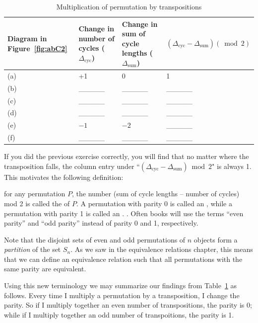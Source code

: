 \begin{table}[!htb]
\caption{Multiplication of permutation by transpositions}\label{transposition_table}
\begin{tabular}{|p{1.9cm}|p{2.9cm}|p{2.9cm}|p{3.5cm}|}
\hline 
\rule{0pt}{2.6ex} Diagram in Figure~\ref{fig:abC2}&  Change in number of cycles ($\Delta_{\text{cyc}}$)   & Change in sum of cycle lengths ($\Delta_{\text{sum}}$) & $(\Delta_{\text{cyc}}-\Delta_{\text{sum}}) (\bmod{2})$  \rule[-1.2ex]{0pt}{0pt} \tabularnewline
\hline
\hline 
\rule{0pt}{2.6ex} (a)  &  +1  & 0  & 1 \rule[-1.2ex]{0pt}{0pt} \tabularnewline
\hline 
\rule{0pt}{2.6ex} (b)  &  \_\_\_\_\_ & \_\_\_\_\_ & \_\_\_\_\_ \rule[-1.2ex]{0pt}{0pt} \tabularnewline
\hline 
\rule{0pt}{2.6ex} (c)  &  \_\_\_\_\_ & \_\_\_\_\_  & \_\_\_\_\_ \rule[-1.2ex]{0pt}{0pt} \tabularnewline
\hline 
\rule{0pt}{2.6ex} (d)  &  \_\_\_\_\_ & \_\_\_\_\_  & \_\_\_\_\_ \rule[-1.2ex]{0pt}{0pt} \tabularnewline
\hline 
\rule{0pt}{2.6ex} (e)  & $-1$ & $-2$ & \_\_\_\_\_ \rule[-1.2ex]{0pt}{0pt} \tabularnewline
\hline 
\rule{0pt}{2.6ex} (f)  &  \_\_\_\_\_ & \_\_\_\_\_ & \_\_\_\_\_  \rule[-1.2ex]{0pt}{0pt} \tabularnewline
\hline 
\end{tabular}
\end{table}


If you did the previous exercise correctly, you will find that no matter where the transposition falls,  the column entry under ``$(\Delta_{\text{cyc}}-\Delta_{\text{sum}}) \bmod{2}$"  is always 1. This motivates the following definition:

\begin{defn} for any permutation $P$, the number (sum of cycle lengths -- number of cycles) mod 2 is called the  of $P$. A permutation with parity 0 is called an , while a  permutation with parity 1 is called an . .  Often books will use the terms ``even parity'' and ``odd parity''  instead of parity 0 and 1, respectively.
\end{defn}
\noindent
Note that the disjoint sets of even and odd permutations of $n$ objects form a \emph{partition} of the set $S_n$. As we saw in the equivalence relations chapter, this means that we can define an equivalence relation such that all permutations with the same parity are equivalent.

Using this new terminology  we may summarize our findings from Table~\ref{transposition_table} as follows. Every time I multiply a permutation by a transposition, I change the parity. So if I multiply together an even number of transpositions, the parity is 0; while if I multiply together an odd number of transpoitions, the parity is 1. 


